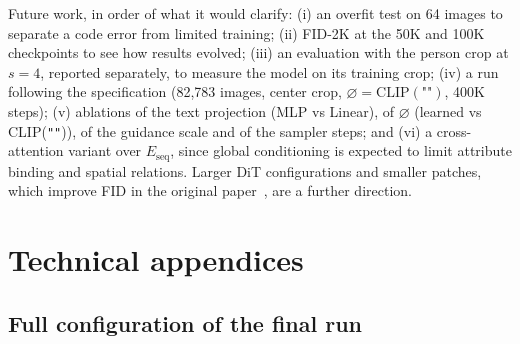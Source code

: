 \documentclass{article}
\newcommand{\nullemb}{\varnothing}
\begin{document}
Future work, in order of what it would clarify:
(i) an overfit test on 64 images to separate a code error from limited training;
(ii) FID-2K at the 50K and 100K checkpoints to see how results evolved;
(iii) an evaluation with the person crop at $s=4$, reported separately, to measure the model on its training crop;
(iv) a run following the specification (82,783 images, center crop, $\nullemb=\mathrm{CLIP}(\texttt{""})$, 400K steps);
(v) ablations of the text projection (MLP vs Linear), of $\nullemb$ (learned vs CLIP(\texttt{""})), of the guidance scale and of the sampler steps;
and (vi) a cross-attention variant over $E_{\mathrm{seq}}$, since global conditioning is expected to limit attribute binding and spatial relations.
Larger DiT configurations and smaller patches, which improve FID in the original paper~\cite{peebles2023dit}, are a further direction.

\small


\normalsize

\appendix
\raggedbottom
\section{Technical appendices}

\subsection{Full configuration of the final run}
\label{app:config}
\end{document}
